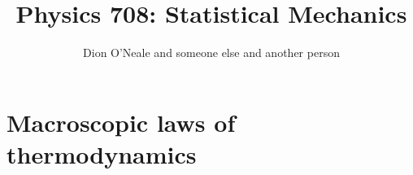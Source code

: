 \documentclass{article}
\title{Physics 708: Statistical Mechanics}
\author{Dion O'Neale 
	and someone else 
    and another person}
\begin{document}
\maketitle
\section{Macroscopic laws of thermodynamics}
\end{document}
